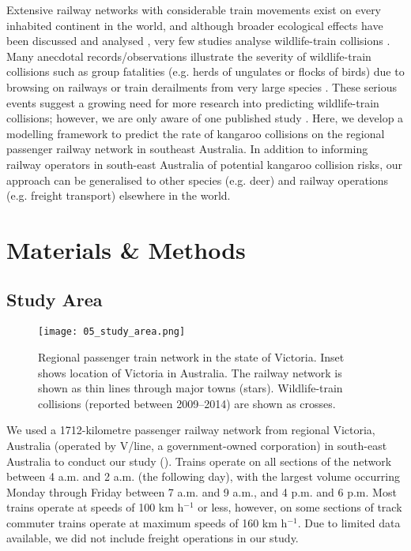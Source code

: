 Extensive railway networks with considerable train movements exist on every inhabited continent in the world, and although broader ecological effects have been discussed \citep{desa93,givo06} and analysed \citep{wall05}, very few studies analyse wildlife-train collisions \citep[but see][]{bela95,onoy98}. Many anecdotal records/observations illustrate the severity of wildlife-train collisions such as group fatalities (e.g. herds of ungulates or flocks of birds) due to browsing on railways or train derailments from very large species \citep{dors15}. These serious events suggest a growing need for more research into predicting wildlife-train collisions; however, we are only aware of one published study \citep[see][]{gund98}. Here, we develop a modelling framework to predict the rate of kangaroo collisions on the regional passenger railway network in southeast Australia. In addition to informing railway operators in south-east Australia of potential kangaroo collision risks, our approach can be generalised to other species (e.g. deer) and railway operations (e.g. freight transport) elsewhere in the world.

\section{Materials \& Methods}

\subsection{Study Area}

\begin{figure*}[htp]
  \centering
  \texttt{[image: 05\_study\_area.png]}
  \caption[Regional passenger train network in Victoria]{Regional passenger train network in the state of Victoria. Inset shows location of Victoria in Australia. The railway network is shown as thin lines through major towns (stars). Wildlife-train collisions (reported between 2009--2014) are shown as crosses.}
  \label{trains_study_area}
\end{figure*}

We used a 1712-kilometre passenger railway network from regional Victoria, Australia (operated by V/line, a government-owned corporation) in south-east Australia to conduct our study ().  Trains operate on all sections of the network between 4 a.m. and 2 a.m. (the following day), with the largest volume occurring Monday through Friday between 7 a.m. and 9 a.m., and 4 p.m. and 6 p.m. Most trains operate at speeds of 100 km h$^{-1}$ or less, however, on some sections of track commuter trains operate at maximum speeds of 160 km h$^{-1}$. Due to limited data available, we did not include freight operations in our study.


